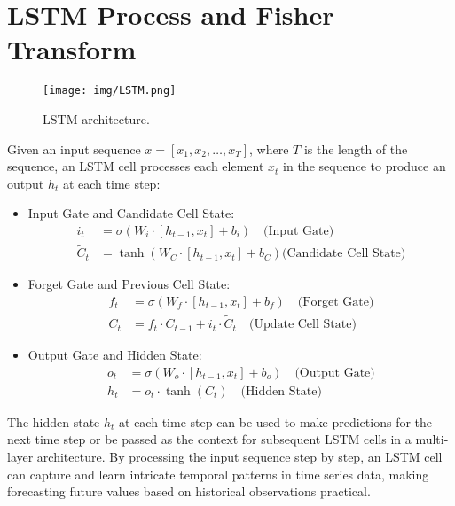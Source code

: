 \section{LSTM Process and Fisher Transform}

\vspace{12pt}

\begin{figure}[!htbp]
\centerline{\texttt{[image: img/LSTM.png]}}
\caption{LSTM architecture.}
\label{LSTM}
\end{figure}

Given an input sequence \(x = [x_1, x_2, \ldots, x_T]\), where \(T\) is the length of the sequence, an LSTM cell processes each element \(x_t\) in the sequence to produce an output \(h_t\) at each time step:
\begin{itemize}

    \item Input Gate and Candidate Cell State:
    \begin{align*}
    i_t &= \sigma(W_i \cdot [h_{t-1}, x_t] + b_i) \quad \text{(Input Gate)} \\
    \tilde{C}_t &= \tanh(W_C \cdot [h_{t-1}, x_t] + b_C) 
      \text{(Candidate Cell State)}
   \end{align*}
   
    \item Forget Gate and Previous Cell State:
    \begin{align*}
   f_t &= \sigma(W_f \cdot [h_{t-1}, x_t] + b_f) \quad \text{(Forget Gate)} \\
   C_t &= f_t \cdot C_{t-1} + i_t \cdot \tilde{C}_t \quad \text{(Update Cell State)}
   \end{align*}

   \item Output Gate and Hidden State:
   \begin{align*}
   o_t &= \sigma(W_o \cdot [h_{t-1}, x_t] + b_o) \quad \text{(Output Gate)} \\
   h_t &= o_t \cdot \tanh(C_t) \quad \text{(Hidden State)}
   \end{align*}
    
\end{itemize}

The hidden state \(h_t\) at each time step can be used to make predictions for the next time step or be passed as the context for subsequent LSTM cells in a multi-layer architecture. By processing the input sequence step by step, an LSTM cell can capture and learn intricate temporal patterns in time series data, making forecasting future values based on historical observations practical.

